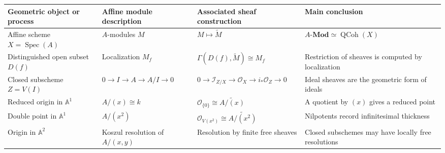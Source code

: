 \documentclass[12pt,a4paper]{article}
\theoremstyle{notespace}
\begin{document}
\begin{table}[htbp]
	\centering
	\renewcommand{\arraystretch}{1.45}
	\begin{adjustbox}{max width=\textwidth}
		\begin{tabular}{
				|>{\raggedright\arraybackslash}p{4.2cm}
				|>{\raggedright\arraybackslash}p{5.2cm}
				|>{\raggedright\arraybackslash}p{5.2cm}
				|>{\raggedright\arraybackslash}p{5.3cm}|
			}
			\hline
			\textbf{Geometric object or process}
			&
			\textbf{Affine module description}
			&
			\textbf{Associated sheaf construction}
			&
			\textbf{Main conclusion}
			\\
			\hline
			
			Affine scheme
			\(\displaystyle X=\operatorname{Spec}(A)\)
			&
			\(A\)-modules \(M\)
			&
			\(\displaystyle M\longmapsto\widetilde{M}\)
			&
			\(\displaystyle
			A\text{-}\mathbf{Mod}
			\simeq
			\operatorname{QCoh}(X)
			\)
			\\
			\hline
			
			Distinguished open subset
			\(\displaystyle D(f)\)
			&
			Localization
			\(\displaystyle M_{f}\)
			&
			\(\displaystyle
			\Gamma(D(f),\widetilde{M})\cong M_{f}
			\)
			&
			Restriction of sheaves is computed by localization
			\\
			\hline
			
			Closed subscheme
			\(\displaystyle Z=V(I)\)
			&
			\(\displaystyle
			0\to I\to A\to A/I\to0
			\)
			&
			\(\displaystyle
			0\to\mathcal{I}_{Z/X}
			\to\mathcal{O}_{X}
			\to i_{*}\mathcal{O}_{Z}
			\to0
			\)
			&
			Ideal sheaves are the geometric form of ideals
			\\
			\hline
			
			Reduced origin in
			\(\displaystyle\mathbb{A}^{1}\)
			&
			\(\displaystyle A/(x)\cong k\)
			&
			\(\displaystyle
			\mathcal{O}_{\{0\}}
			\cong
			\widetilde{A/(x)}
			\)
			&
			A quotient by \((x)\) gives a reduced point
			\\
			\hline
			
			Double point in
			\(\displaystyle\mathbb{A}^{1}\)
			&
			\(\displaystyle A/(x^{2})\)
			&
			\(\displaystyle
			\mathcal{O}_{V(x^{2})}
			\cong
			\widetilde{A/(x^{2})}
			\)
			&
			Nilpotents record infinitesimal thickness
			\\
			\hline
			
			Origin in
			\(\displaystyle\mathbb{A}^{2}\)
			&
			Koszul resolution of
			\(\displaystyle A/(x,y)\)
			&
			Resolution by finite free sheaves
			&
			Closed subschemes may have locally free resolutions
			\\
			\hline
			

\end{tabular}
\end{adjustbox}
\end{table}
\end{document}
